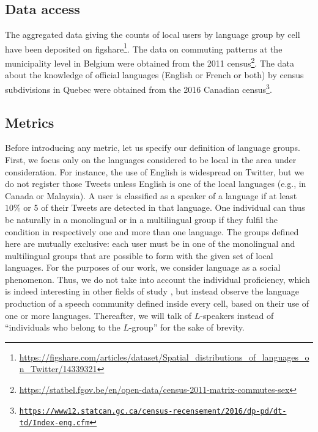 \documentclass[../thesis.tex]{subfiles}
\begin{document}
\subsection{Data access}
The aggregated data giving the counts of local users by language group by cell have been
deposited on
figshare\footnote{\url{https://figshare.com/articles/dataset/Spatial_distributions_of_languages_on_Twitter/14339321}}.
The data on commuting patterns at the municipality level in Belgium were obtained from
the 2011
census\footnote{\url{https://statbel.fgov.be/en/open-data/census-2011-matrix-commutes-sex}}.
The data about the knowledge of official languages (English or French or both) by census
subdivisions in Quebec were obtained from the 2016 Canadian
census\footnote{\href{https://www12.statcan.gc.ca/census-recensement/2016/dp-pd/dt-td/Rp-eng.cfm?TABID=2&LANG=E&A=R&APATH=3&DETAIL=0&DIM=0&FL=A&FREE=0&GC=01&GL=-1&GID=1159582&GK=1&GRP=1&O=D&PID=110461&PRID=10&PTYPE=109445&S=0&SHOWALL=0&SUB=0&Temporal=2016&THEME=118&VID=0&VNAMEE=&VNAMEF=&D1=0&D2=0&D3=0&D4=0&D5=0&D6=0}{\texttt{https://www12.statcan.gc.ca/census-recensement/2016/dp-pd/dt-td/Index-eng.cfm}}}.



\subsection{Metrics}
Before introducing any metric, let us specify our definition of language groups. First,
we focus only on the languages considered to be local in the area under consideration.
For instance, the use of English is widespread on Twitter, but we do not register those
Tweets unless English is one of the local languages (e.g., in Canada or Malaysia). A
user is classified as a speaker of a language if at least $10\%$ or 5 of their Tweets
are detected in that language. One individual can thus be naturally in a monolingual or
in a multilingual group if they fulfil the condition in respectively one and more than one language. The
groups defined here are mutually exclusive: each user must be in one of the monolingual
and multilingual groups that are possible to form with the given set of local languages.
For the purposes of our work, we consider language as a social phenomenon. Thus, we do
not take into account the individual proficiency, which is indeed interesting in other
fields of study \cite{BakerFoundationsBilingual1997}, but instead observe the language
production of a speech community defined inside every cell, based on their use of one or
more languages. Thereafter, we will talk of $L$-speakers instead of ``individuals who
belong to the $L$-group'' for the sake of brevity.
\end{document}
